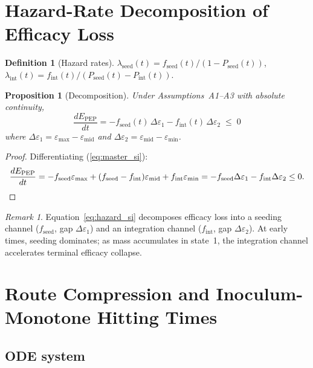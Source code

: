 \documentclass[11pt]{article}
\newtheorem{proposition}{Proposition}[section]
\theoremstyle{definition}
\newtheorem{definition}{Definition}[section]
\theoremstyle{remark}
\newtheorem*{remark}{Remark}
\newcommand{\Pseed}{P_{\text{seed}}}
\newcommand{\Pint}{P_{\text{int}}}
\newcommand{\Epep}{E_{\text{PEP}}}
\newcommand{\emax}{\varepsilon_{\max}}
\newcommand{\emid}{\varepsilon_{\text{mid}}}
\newcommand{\emin}{\varepsilon_{\min}}
\begin{document}
\section{Hazard-Rate Decomposition of Efficacy Loss}

\begin{definition}[Hazard rates]
$\lambda_{\text{seed}}(t) = f_{\text{seed}}(t)/(1 - \Pseed(t))$, $\lambda_{\text{int}}(t) = f_{\text{int}}(t)/(\Pseed(t) - \Pint(t))$.
\end{definition}

\begin{proposition}[Decomposition]\label{prop:hazard}
Under Assumptions~A1--A3 with absolute continuity,
\begin{equation}
\frac{d\Epep}{dt} = -f_{\text{seed}}(t)\,\Delta\varepsilon_{1} - f_{\text{int}}(t)\,\Delta\varepsilon_{2} \;\leq\; 0
\label{eq:hazard_si}
\end{equation}
where $\Delta\varepsilon_{1} = \emax - \emid$ and $\Delta\varepsilon_{2} = \emid - \emin$.
\end{proposition}

\begin{proof}
Differentiating (\ref{eq:master_si}):
\[
\frac{d\Epep}{dt} = -f_{\text{seed}}\emax + (f_{\text{seed}} - f_{\text{int}})\emid + f_{\text{int}}\emin = -f_{\text{seed}}\Delta\varepsilon_{1} - f_{\text{int}}\Delta\varepsilon_{2} \leq 0. \qedhere
\]
\end{proof}

\begin{remark}
Equation~\ref{eq:hazard_si} decomposes efficacy loss into a seeding channel ($f_{\text{seed}}$, gap $\Delta\varepsilon_{1}$) and an integration channel ($f_{\text{int}}$, gap $\Delta\varepsilon_{2}$). At early times, seeding dominates; as mass accumulates in state~1, the integration channel accelerates terminal efficacy collapse.
\end{remark}

\section{Route Compression and Inoculum-Monotone Hitting Times}

\subsection{ODE system}
\end{document}
